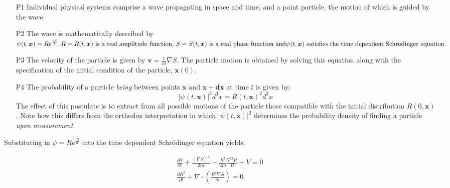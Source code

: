 \documentclass{article}
\begin{document}
\begin{itemize}
\item [P1] Individual physical systems comprise a wave propagating in space and time, and a point particle, the motion of which is guided by the wave.
\item [P2] The wave is mathematically described by $\psi(t,\boldsymbol{x}) = Re^{\frac{iS}{\hbar}}, R=R(t,\boldsymbol{x}) \text{ is a real amplitude function, } \\S=S(t,\boldsymbol{x}) \text{ is a real phase function and} \psi(t,\boldsymbol{x}) \text{ satisfies the time dependent Schr{\"o}dinger equation.}$
\item [P3] The velocity of the particle is given by $\boldsymbol{v} = \frac{1}{m}\nabla{S}$. The particle motion is obtained by solving this equation along with the specification of the initial condition of the particle, $\boldsymbol{x}(0)$.
\item [P4] The probability of a particle \textit{being} between points $\boldsymbol{x} \text{ and } \boldsymbol{x + dx}$ at time $t$ is given by:
\begin{equation}
	|\psi(t,\boldsymbol{x})|^2d^3x = R(t,\boldsymbol{x})^2d^3x
\end{equation}
The effect of this postulate is to extract from all possible motions of the particle those compatible with the initial distribution $R(0,\boldsymbol{x})$. Note how this differs from the orthodox interpretation in which $|\psi(t,\boldsymbol{x})|^2$ determines the probability density of finding a particle \textit{upon measurement}.
\end{itemize}

\noindent Substituting in $\psi = Re^{\frac{iS}{\hbar}}$ into the time dependent Schr{\"o}dinger equation yields:

\begin{subequations}
\begin{flalign}
	&\frac{\partial S}{\partial t}+\frac{(\nabla S)^2}{2m}-\frac{\hbar^2}{2m}\frac{\nabla^2 R}{R}+V=0& \label{dBBHJ} \\
	&\frac{\partial R^2}{\partial t}+\nabla\cdot\left(\frac{R^2\nabla S}{m}\right)=0 \label{dBBcontinuity}
\end{flalign}
\end{subequations}
\end{document}
